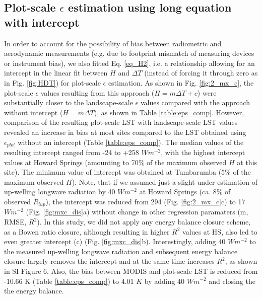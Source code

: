 \documentclass[fleqn,10pt]{wlscirep}
\begin{document}
\subsection{Plot-scale $\epsilon$ estimation using long equation with intercept}
In order to account for the possibility of bias between radiometric and aerodynamic measurements (e.g. due to footprint mismatch of measuring devices or instrument bias), we also fitted Eq. \ref{eq_H2}, i.e. a relationship allowing for an intercept in the linear fit between $H$ and $\Delta T$ (instead of forcing it through zero as in Fig. \ref{fig:HDT}) for plot-scale $\epsilon$ estimation. As shown in Fig. \ref{fig:2_mx_c}, the plot-scale $\epsilon$ values resulting from this approach ($H=m \Delta T + c$) were substantially closer to the landscape-scale $\epsilon$ values compared with the approach without intercept ($H=m \Delta T$), as shown in Table \ref{table:eps_comp}. However, comparison of the resulting plot-scale LST with landscape-scale LST values revealed an increase in bias at most sites compared to the LST obtained using $\epsilon_{plot}$ without an intercept (Table \ref{table:eps_comp}). The median values of the resulting intercept ranged from -24 to +258 $Wm^{-2}$, with the highest intercept values at Howard Springs (amounting to 70\% of the maximum observed $H$ at this site). The minimum value of intercept was obtained at Tumbarumba (5\% of the maximum observed $H$). Note, that if we assumed just a slight under-estimation of up-welling longwave radiation by 40 $Wm^{-2}$ at Howard Springs (ca. 8\% of observed $R_{lup}$), the intercept was reduced from 294 (Fig. \ref{fig:2_mx_c}c) to 17 $Wm^{-2}$ (Fig. \ref{fig:mxc_dis}a) without change in other regression paramaters (m, RMSE, $R^{2}$). In this study, we did not apply any energy balance closure scheme, as a Bowen ratio closure, although resulting in higher $R^{2}$ values at HS, also led to even greater intercept (c) (Fig. \ref{fig:mxc_dis}b). Interestingly, adding 40 $Wm^{-2}$ to the  measured up-welling longwave radiation and subsequent energy balance closure largely removes the intercept and at the same time increases $R^2$, as shown in SI Figure 6. Also, the bias between MODIS and plot-scale LST is reduced from -10.66 K (Table \ref{table:eps_comp}) to 4.01 $K$ by adding 40 $Wm^{-2}$ and closing the the energy balance. 
\end{document}
